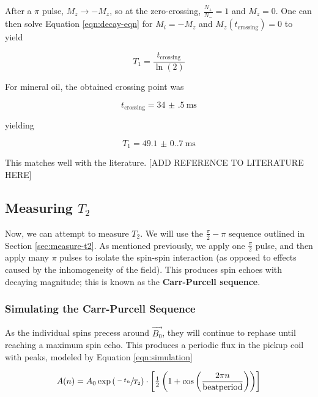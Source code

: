 \documentclass[%
 reprint,
 amsmath,amssymb,
 aps,
]{revtex4-2}
\newcommand{\halfpi}{\frac{\pi}{2}}
\begin{document}
After a $\pi$ pulse, $M_z \rightarrow -M_z$, so at the zero-crossing, $\frac{N_+}{N_-} = 1$ and $M_z = 0$. One can then solve Equation \ref{eqn:decay-eqn} for $M_i = -M_z$ and $M_z(t_\text{crossing}) = 0$ to yield

\begin{equation}
    T_1 = \frac{t_\text{crossing}}{\ln(2)}
\end{equation}

For mineral oil, the obtained crossing point was 

\begin{equation}
    t_\text{crossing} = \SI[separate-uncertainty = true]{34(.5)}{\milli\second}
\end{equation}

yielding 

\begin{equation}
    T_1 = \SI[separate-uncertainty=true]{49.1(0.7)}{\milli\second}
\end{equation}

This matches well with the literature. [ADD REFERENCE TO LITERATURE HERE]

\subsection{Measuring $T_2$}

Now, we can attempt to measure $T_2$. We will use the $\halfpi-\pi$ sequence outlined in Section \ref{sec:measure-t2}. As mentioned previously, we apply one $\halfpi$ pulse, and then apply many $\pi$ pulses to isolate the spin-spin interaction (as opposed to effects caused by the inhomogeneity of the field). This produces spin echoes with decaying magnitude; this is known as the \textbf{Carr-Purcell sequence}. 

\subsubsection{Simulating the Carr-Purcell Sequence}

As the individual spins precess around \(\vec{B_0}\), they will continue to rephase until reaching a maximum spin echo. This produces a periodic flux in the pickup coil with peaks, modeled by Equation \ref{eqn:simulation}

\begin{equation}\label{eqn:simulation}
    A(n) = A_0 \exp{\left( \sfrac{-t_n}{T_2} \right)} \cdot \left[ \tfrac{1}{2} \left(1 + \cos \left( \frac{2\pi n}{\mathrm{beatperiod}} \right)\right) \right]
\end{equation}
\end{document}
